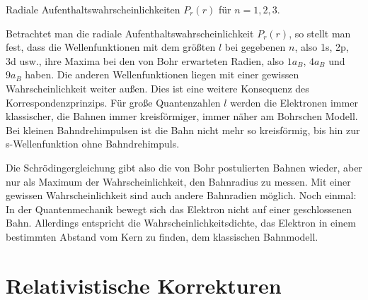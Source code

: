 \begin{marginfigure}
    \caption{Radiale Aufenthaltswahrscheinlichkeiten  $P_r(r)$ für $n=1,2,3$.}
\end{marginfigure}

Betrachtet man die radiale Aufenthaltswahrscheinlichkeit $P_r(r)$, so stellt man fest, dass die Wellenfunktionen mit dem größten $l$ bei gegebenen $n$, also 1s, 2p, 3d usw., ihre Maxima bei den von Bohr erwarteten Radien, also $1 a_B$, $4 a_B$ und $9 a_B$ haben. Die anderen Wellenfunktionen liegen mit einer gewissen Wahrscheinlichkeit weiter außen. Dies ist eine weitere Konsequenz des Korrespondenzprinzips. Für große Quantenzahlen $l$ werden die Elektronen immer klassischer, die Bahnen immer kreisförmiger, immer näher am Bohrschen Modell. Bei kleinen Bahndrehimpulsen ist die Bahn nicht mehr so kreisförmig, bis hin zur s-Wellenfunktion ohne Bahndrehimpuls.

Die Schrödingergleichung gibt also die von Bohr postulierten Bahnen wieder, aber nur als Maximum der Wahrscheinlichkeit, den Bahnradius zu messen. Mit einer gewissen Wahrscheinlichkeit sind auch andere Bahnradien möglich. Noch einmal: In der Quantenmechanik bewegt sich das Elektron nicht auf einer geschlossenen Bahn. Allerdings entspricht die Wahrscheinlichkeitsdichte, das Elektron in einem bestimmten Abstand vom Kern zu finden, dem klassischen Bahnmodell.



\section{Relativistische Korrekturen}


